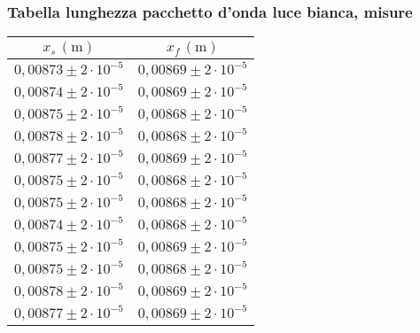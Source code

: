 \subsubsection{Tabella lunghezza pacchetto d'onda luce bianca, misure}
    \begin{table}[H]
    \centering
        \begin{tabular}{|c|c|}
        \hline
        $ x_s \, (\text{m}) $ & $ x_f \, (\text{m}) $ \\
        \hline
        $0,00873 \pm 2 \cdot 10^{-5}$ & $0,00869 \pm 2 \cdot 10^{-5}$ \\
        \hline
        $0,00874 \pm 2 \cdot 10^{-5}$ & $0,00869 \pm 2 \cdot 10^{-5}$ \\
        \hline
        $0,00875 \pm 2 \cdot 10^{-5}$ & $0,00868 \pm 2 \cdot 10^{-5}$ \\
        \hline
        $0,00878 \pm 2 \cdot 10^{-5}$ & $0,00868 \pm 2 \cdot 10^{-5}$ \\
        \hline
        $0,00877 \pm 2 \cdot 10^{-5}$ & $0,00869 \pm 2 \cdot 10^{-5}$ \\
        \hline
        $0,00875 \pm 2 \cdot 10^{-5}$ & $0,00868 \pm 2 \cdot 10^{-5}$ \\
        \hline
        $0,00875 \pm 2 \cdot 10^{-5}$ & $0,00868 \pm 2 \cdot 10^{-5}$ \\
        \hline
        $0,00874 \pm 2 \cdot 10^{-5}$ & $0,00868 \pm 2 \cdot 10^{-5}$ \\
        \hline
        $0,00875 \pm 2 \cdot 10^{-5}$ & $0,00869 \pm 2 \cdot 10^{-5}$ \\
        \hline
        $0,00875 \pm 2 \cdot 10^{-5}$ & $0,00868 \pm 2 \cdot 10^{-5}$ \\
        \hline
        $0,00878 \pm 2 \cdot 10^{-5}$ & $0,00869 \pm 2 \cdot 10^{-5}$ \\
        \hline
        $0,00877 \pm 2 \cdot 10^{-5}$ & $0,00869 \pm 2 \cdot 10^{-5}$ \\
        \hline
        \end{tabular}
    \end{table}
